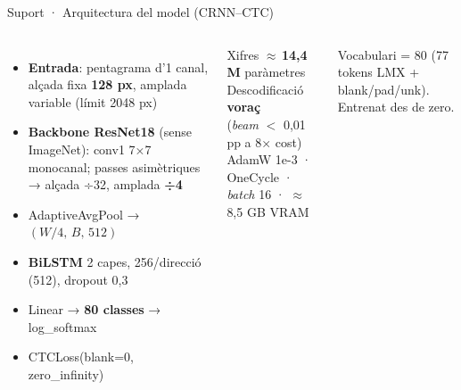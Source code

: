\documentclass[aspectratio=169,10pt]{beamer}
\newcommand{\code}[1]{{\ttfamily\small #1}}
\begin{document}

\begin{frame}{Suport · Arquitectura del model (CRNN--CTC)}
  \vspace{0.2em}
  \begin{columns}[T]
    {\small
    \begin{itemize}\setlength\itemsep{0.35em}
      \item \textbf{Entrada}: pentagrama d'1 canal, alçada fixa \textbf{128 px}, amplada variable (límit 2048 px)
      \item \textbf{Backbone ResNet18} (sense ImageNet): conv1 7×7 monocanal; passes asimètriques → alçada ÷32, amplada \textbf{÷4}
      \item \code{AdaptiveAvgPool} → $(W/4,\,B,\,512)$
      \item \textbf{BiLSTM} 2 capes, 256/direcció (512), dropout 0,3
      \item \code{Linear} → \textbf{80 classes} → \code{log\_softmax}
      \item \code{CTCLoss(blank=0, zero\_infinity)}
    \end{itemize}}

    \begin{block}{Xifres}
      {\small $\approx$\,\textbf{14,4 M} paràmetres\\[0.25em]
      Descodificació \textbf{voraç}\\(\textit{beam} $<$ 0,01 pp a 8× cost)\\[0.25em]
      AdamW 1e-3 · OneCycle · \textit{batch} 16 · $\approx$8,5 GB VRAM}
    \end{block}
    {\footnotesize\color{muted} Vocabulari = 80 (77 tokens LMX + blank/pad/unk). Entrenat des de zero.}
  \end{columns}
\end{frame}
\end{document}
